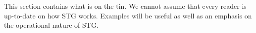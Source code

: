 This section contains what is on the tin.
We cannot assume that every reader is up-to-date on how STG works.
Examples will be useful as well as an emphasis on the operational nature of STG.
